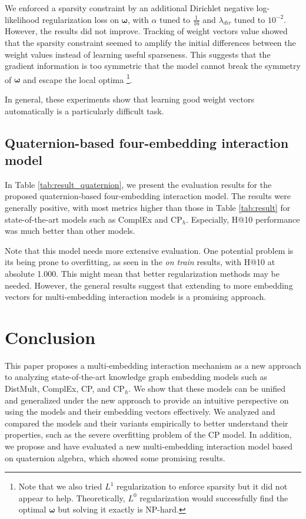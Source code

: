 \documentclass[sigconf,edbt]{acmart-edbt2019}
\begin{document}
We enforced a sparsity constraint by an additional Dirichlet negative log-likelihood regularization loss on $ \bm{\omega} $, with $ \alpha $ tuned to $ \frac{1}{16} $ and $ \lambda_{dir} $ tuned to $ 10^{-2} $. However, the results did not improve. Tracking of weight vectors value showed that the sparsity constraint seemed to amplify the initial differences between the weight values instead of learning useful sparseness. This suggests that the gradient information is too symmetric that the model cannot break the symmetry of $ \bm{\omega} $ and escape the local optima \footnote{Note that we also tried $ L^1 $ regularization to enforce sparsity but it did not appear to help. Theoretically, $ L^0 $ regularization would successfully find the optimal $ \bm{\omega} $ but solving it exactly is NP-hard.}.

In general, these experiments show that learning good weight vectors automatically is a particularly difficult task.

\subsection{Quaternion-based four-embedding interaction model} 
In Table \ref{tab:result_quaternion}, we present the evaluation results for the proposed quaternion-based four-embedding interaction model. The results were generally positive, with most metrics higher than those in Table \ref{tab:result} for state-of-the-art models such as ComplEx and CP$ _h $. Especially, H@10 performance was much better than other models.

Note that this model needs more extensive evaluation. One potential problem is its being prone to overfitting, as seen in the \textit{on train} results, with H@10 at absolute 1.000. This might mean that better regularization methods may be needed. However, the general results suggest that extending to more embedding vectors for multi-embedding interaction models is a promising approach.

\section{Conclusion}
This paper proposes a multi-embedding interaction mechanism as a new approach to analyzing state-of-the-art knowledge graph embedding models such as DistMult, ComplEx, CP, and CP$ _h $. We show that these models can be unified and generalized under the new approach to provide an intuitive perspective on using the models and their embedding vectors effectively. We analyzed and compared the models and their variants empirically to better understand their properties, such as the severe overfitting problem of the CP model. In addition, we propose and have evaluated a new multi-embedding interaction model based on quaternion algebra, which showed some promising results.
\end{document}
